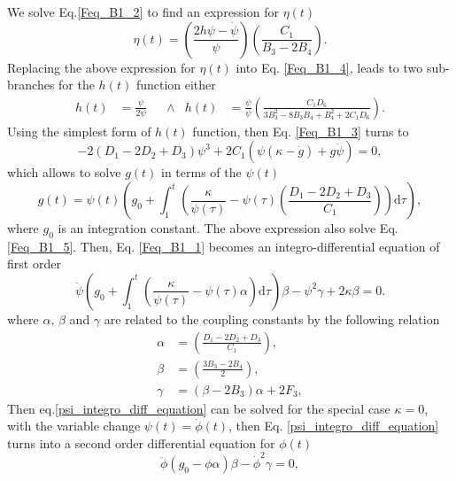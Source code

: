 We solve Eq.\eqref{Feq_B1_2} to find an expression for $\eta(t)$
\begin{equation}
    \label{B1_eta}
    \eta(t) = \left(\frac{2h\psi - \dot{\psi}}{\psi}\right)\left(\frac{C_1}{B_3 - 2B_4}\right).
\end{equation}
Replacing the above expression for $\eta(t)$ into Eq. \eqref{Feq_B1_4}, leads to two sub-branches for the $h(t)$ function either
\begin{align}
    \label{B1_h}
    h(t) & = \frac{\dot{\psi}}{2\psi} & & \wedge &  h(t) & = \frac{\dot{\psi}}{\psi}\left(\frac{C_1 D_6}{3B_3^2 - 8B_3B_4 + B_4^2 + 2C_1D_6}\right).
\end{align}
Using the simplest form of $h(t)$ function, then Eq. \eqref{Feq_B1_3} turns to
\begin{equation}
    -2\left(D_1 - 2D_2 + D_3\right)\psi^3 + 2C_1\left(\psi\left(\kappa - \dot{g}\right) + g\dot{\psi}\right) = 0,
\end{equation}
which allows to solve $g(t)$ in terms of the $\psi(t)$ 
\begin{equation}
    \label{B1_g}
    g(t) = \psi(t) \left(g_0 + \int_1^t \left(\frac{\kappa}{\psi(\tau)} - \psi(\tau) \left(\frac{D_1 - 2D_2 + D_3}{C_1}\right)\right) \mathrm{d}\tau\right),
\end{equation}
where $g_0$ is an integration constant. The above expression also solve Eq. \eqref{Feq_B1_5}. Then, Eq. \eqref{Feq_B1_1} becomes 
an integro-differential equation of first order
\begin{dmath}
    \label{psi_integro_diff_equation}
    \dot{\psi}\left(g_0 + \int_1^t \left(\frac{\kappa}{\psi(\tau)} - \psi(\tau) \alpha\right) \mathrm{d}\tau\right)\beta -
    \psi^2 \gamma + 2\kappa\beta = 0.
\end{dmath}
where $\alpha$, $\beta$ and $\gamma$ are related to the coupling constants
by the following relation
\begin{align}
    \alpha & = \left(\frac{D_1 - 2D_2 + D_3}{C_1}\right), \\
    \beta & = \left(\frac{3B_3 - 2B_4}{2}\right), \\
    \gamma & = \left(\beta - 2B_3\right)\alpha + 2F_3,
\end{align}
Then eq.\eqref{psi_integro_diff_equation} can be solved for the special case $\kappa = 0$, with the variable change $\psi (t) = \dot{\phi}(t)$, 
then Eq. \eqref{psi_integro_diff_equation} turns into a second order differential equation for $\phi(t)$
\begin{dmath}
    \ddot{\phi}\left(g_0  - \phi\alpha\right)\beta - \dot{\phi}^2 \gamma  = 0,
\end{dmath}
